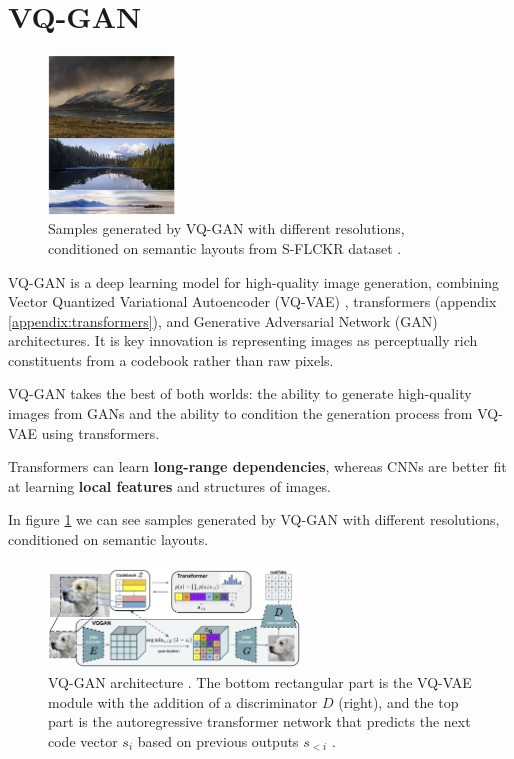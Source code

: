 \section{VQ-GAN}
\label{vqgan}

\begin{figure}
    \centering
    \includegraphics[width=0.3\textwidth]{images/vqgan_samples.png}
    \caption{Samples generated by VQ-GAN with different resolutions, conditioned on semantic layouts from S-FLCKR dataset \cite{vqgan}.}
    \label{fig:vqgan_samples}
\end{figure}


VQ-GAN \cite{vqgan} is a deep learning model for high-quality image generation, combining Vector Quantized Variational Autoencoder (VQ-VAE) \cite{vqvae}, transformers \cite{transformer} (appendix \ref{appendix:transformers}), and Generative Adversarial Network (GAN) \cite{gan} architectures. It is key innovation is representing images as perceptually rich constituents from a codebook rather than raw pixels.

VQ-GAN takes the best of both worlds: the ability to generate high-quality images from GANs and the ability to condition the generation process from VQ-VAE using transformers.

Transformers can learn \textbf{long-range dependencies}, whereas CNNs \cite{cnn} are better fit at learning \textbf{local features} and structures of images.

In figure \ref{fig:vqgan_samples} we can see samples generated by VQ-GAN with different resolutions, conditioned on semantic layouts.

\begin{figure}
    \centering
    \includegraphics[width=0.6\textwidth]{images/vqgan_architecture.png}
    \caption{VQ-GAN architecture \cite{vqgan}. The bottom rectangular part is the VQ-VAE module with the addition of a discriminator $D$ (right), and the top part is the autoregressive transformer network that predicts the next code vector $s_i$ based on previous outputs $s_{<i}$ \cite{vqgan}.}
    \label{fig:vqgan_architecture}
\end{figure}

